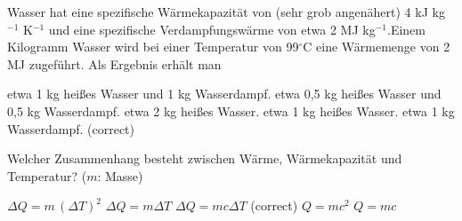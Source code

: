 \documentclass[11pt]{exam}
\begin{document}
\begin{questions}
\vspace{3mm}\question Wasser hat eine spezifische Wärmekapazität von (sehr grob angenähert) 4 kJ kg\(^{-1}\) K\(^{-1}\) und eine spezifische Verdampfungswärme von etwa 2 MJ kg\(^{-1}\).Einem Kilogramm Wasser wird bei einer Temperatur von 99\(^\circ\)C eine Wärmemenge von 2 MJ zugeführt. Als Ergebnis erhält man

\begin{choices}
	\choice etwa 1 kg heißes Wasser und 1 kg Wasserdampf.
	\choice etwa 0,5 kg heißes Wasser und 0,5 kg Wasserdampf.
	\choice etwa 2 kg heißes Wasser.
	\choice etwa 1 kg heißes Wasser.
	\choice etwa 1 kg Wasserdampf. (correct)
\end{choices}

\vspace{3mm}\question Welcher Zusammenhang besteht zwischen Wärme, Wärmekapazität und Temperatur? (\(m\): Masse)

\begin{choices}
	\choice \(\Delta Q = m \, (\Delta T)^2\)
	\choice \(\Delta Q = m \Delta T\)
	\choice \(\Delta Q = m c \Delta T\) (correct)
	\choice \(Q = m c^2\)
	\choice \(Q = m c\)
\end{choices}

\vspace{3mm}\end{questions}
\end{document}
